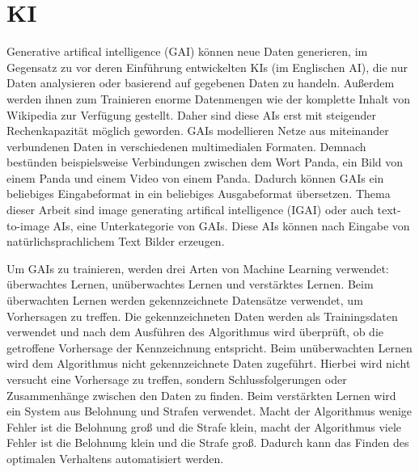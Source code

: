 \documentclass[12pt]{report}
\begin{document}
\section{KI}\label{def_ki}
Generative artifical intelligence (GAI) können neue Daten generieren, im Gegensatz zu vor deren Einführung entwickelten \ac{KI}s (im Englischen \ac{AI}), die nur Daten analysieren oder basierend auf gegebenen Daten zu handeln. Außerdem werden ihnen zum Trainieren enorme Datenmengen wie der komplette Inhalt von Wikipedia zur Verfügung gestellt. Daher sind diese \ac{AI}s erst mit steigender Rechenkapazität möglich geworden. \ac{GAI}s modellieren Netze aus miteinander verbundenen Daten in verschiedenen multimedialen Formaten. Demnach bestünden beispielsweise Verbindungen zwischen dem Wort Panda, ein Bild von einem Panda und einem Video von einem Panda. Dadurch können \ac{GAI}s ein beliebiges Eingabeformat in ein beliebiges Ausgabeformat übersetzen. Thema dieser Arbeit sind image generating artifical intelligence (IGAI) oder auch text-to-image \ac{AI}s, eine Unterkategorie von \ac{GAI}s. Diese \ac{AI}s können nach Eingabe von natürlichsprachlichem Text Bilder erzeugen.
\cite{Roberto}


Um \ac{GAI}s zu trainieren, werden drei Arten von Machine Learning verwendet: überwachtes Lernen, unüberwachtes Lernen und verstärktes Lernen. 
Beim überwachten Lernen werden gekennzeichnete Datensätze verwendet, um Vorhersagen zu treffen. Die gekennzeichneten Daten werden als Trainingsdaten verwendet und nach dem Ausführen des Algorithmus wird überprüft, ob die getroffene Vorhersage der Kennzeichnung entspricht.
Beim unüberwachten Lernen wird dem Algorithmus nicht gekennzeichnete Daten zugeführt. Hierbei wird nicht versucht eine Vorhersage zu treffen, sondern Schlussfolgerungen oder Zusammenhänge zwischen den Daten zu finden.
Beim verstärkten Lernen wird ein System aus Belohnung und Strafen verwendet. Macht der Algorithmus wenige Fehler ist die Belohnung groß und die Strafe klein, macht der Algorithmus viele Fehler ist die Belohnung klein und die Strafe groß. Dadurch kann das Finden des 
optimalen Verhaltens automatisiert werden.
\cite{serafeim}



\end{document}
